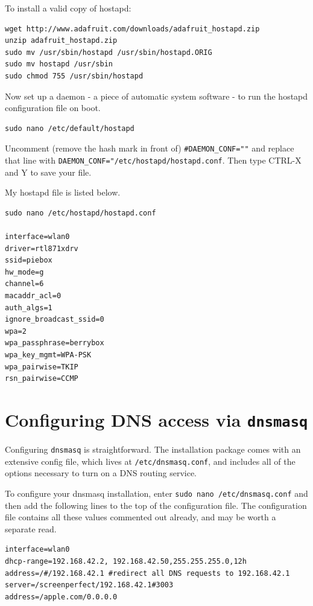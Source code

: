 To install a valid copy of hostapd:
\begin{lstlisting}
wget http://www.adafruit.com/downloads/adafruit_hostapd.zip 
unzip adafruit_hostapd.zip 
sudo mv /usr/sbin/hostapd /usr/sbin/hostapd.ORIG 
sudo mv hostapd /usr/sbin
sudo chmod 755 /usr/sbin/hostapd
\end{lstlisting}
 
Now set up a daemon - a piece of automatic system software - to run the hostapd configuration file on boot.
\begin{lstlisting}
sudo nano /etc/default/hostapd
\end{lstlisting}
Uncomment (remove the hash mark in front of) \texttt{\#DAEMON_CONF=""} and replace that line with \texttt{DAEMON_CONF="/etc/hostapd/hostapd.conf}.
Then type CTRL-X and Y to save your file.

My hostapd file is listed below.

\begin{lstlisting}
sudo nano /etc/hostapd/hostapd.conf

interface=wlan0
driver=rtl871xdrv
ssid=piebox
hw_mode=g
channel=6
macaddr_acl=0
auth_algs=1
ignore_broadcast_ssid=0
wpa=2
wpa_passphrase=berrybox
wpa_key_mgmt=WPA-PSK
wpa_pairwise=TKIP
rsn_pairwise=CCMP

\end{lstlisting}

\section{Configuring DNS access via \texttt{dnsmasq}}

Configuring \texttt{dnsmasq} is straightforward. The installation package comes with an extensive config file, which lives at \texttt{/etc/dnsmasq.conf}, and includes all of the options necessary to turn on a DNS routing service.

To configure your dnsmasq installation, enter \texttt{sudo nano /etc/dnsmasq.conf} and then add the following lines to the top of the configuration file. The configuration file contains all these values commented out already, and may be worth a separate read.

\begin{lstlisting}
interface=wlan0
dhcp-range=192.168.42.2, 192.168.42.50,255.255.255.0,12h
address=/#/192.168.42.1 #redirect all DNS requests to 192.168.42.1
server=/screenperfect/192.168.42.1#3003
address=/apple.com/0.0.0.0
\end{lstlisting}

